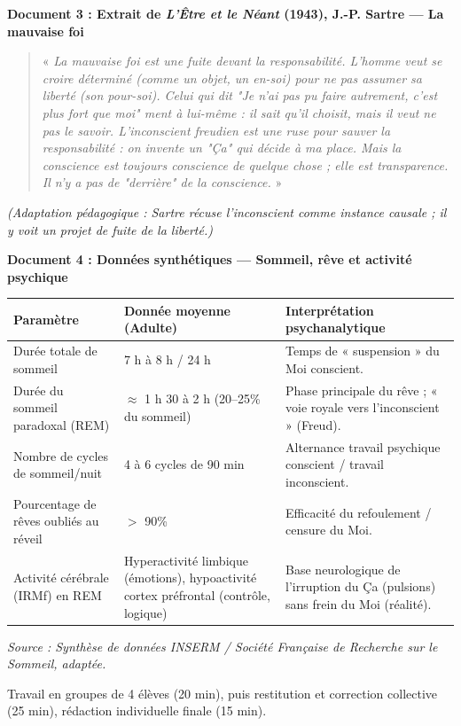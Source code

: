 \documentclass[11pt]{article}
\newcommand{\cle}[1]{{\popxbold\color{popdark}#1}}
\newcounter{popsec}
\newcounter{popsub}
\newcommand{\courssub}[1]{%
  \stepcounter{popsub}%
  \par\vspace{9pt}\noindent{\popxbold\fontsize{11.5}{13}\selectfont\color{popink}{\color{poporange}\thepopsec.\thepopsub}\hspace{6pt}#1}\par\nopagebreak\vspace{4pt}
}
\begin{document}
\textbf{Document 3 : Extrait de \emph{L'Être et le Néant} (1943), J.-P. Sartre — La mauvaise foi}
\begin{quote}
« \emph{La mauvaise foi est une fuite devant la responsabilité. L'homme veut se croire déterminé (comme un objet, un \emph{en-soi}) pour ne pas assumer sa liberté (son \emph{pour-soi}). Celui qui dit "Je n'ai pas pu faire autrement, c'est plus fort que moi" ment à lui-même : il \emph{sait} qu'il choisit, mais il \emph{veut} ne pas le savoir. L'inconscient freudien est une ruse pour sauver la responsabilité : on invente un "Ça" qui décide à ma place. Mais la conscience est toujours conscience \emph{de} quelque chose ; elle est transparence. Il n'y a pas de "derrière" de la conscience.} » 
\end{quote}
\textit{(Adaptation pédagogique : Sartre récuse l'inconscient comme instance causale ; il y voit un projet de fuite de la liberté.)}

\textbf{Document 4 : Données synthétiques — Sommeil, rêve et activité psychique}
\begin{center}
\begin{tabularx}{\linewidth}{|l|X|X|}\hline
\textbf{Paramètre} & \textbf{Donnée moyenne (Adulte)} & \textbf{Interprétation psychanalytique} \\ \hline
Durée totale de sommeil & 7 h à 8 h / 24 h & Temps de « suspension » du Moi conscient. \\ \hline
Durée du sommeil paradoxal (REM) & $\approx$ 1 h 30 à 2 h (20--25\% du sommeil) & Phase principale du rêve ; « voie royale vers l'inconscient » (Freud). \\ \hline
Nombre de cycles de sommeil/nuit & 4 à 6 cycles de 90 min & Alternance travail psychique conscient / travail inconscient. \\ \hline
Pourcentage de rêves oubliés au réveil & $>$ 90\% & Efficacité du \cle{refoulement} / censure du Moi. \\ \hline
Activité cérébrale (IRMf) en REM & Hyperactivité limbique (émotions), hypoactivité cortex préfrontal (contrôle, logique) & Base neurologique de l'irruption du \cle{Ça} (pulsions) sans frein du \cle{Moi} (réalité). \\ \hline
\end{tabularx}
\end{center}
\textit{Source : Synthèse de données INSERM / Société Française de Recherche sur le Sommeil, adaptée.}

\courssub{Consignes}
Travail en groupes de 4 élèves (20 min), puis restitution et correction collective (25 min), rédaction individuelle finale (15 min).
\end{document}
